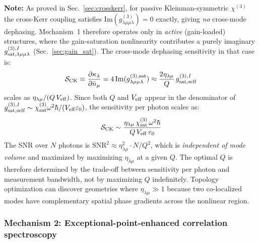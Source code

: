 \documentclass[12pt]{article}
\begin{document}
\textbf{Note:} As proved in Sec.~\ref{sec:crosskerr}, for passive
Kleinman-symmetric $\chi^{(3)}$ the cross-Kerr coupling satisfies
$\mathrm{Im}(g^{(3)}_{\lambda\mu\mu\lambda})=0$ exactly, giving
\emph{no} cross-mode dephasing.  Mechanism~1 therefore operates only in
\emph{active} (gain-loaded) structures, where the gain-saturation
nonlinearity contributes a purely imaginary
$g^{(3),I}_{\rm sat,\lambda\mu\mu\lambda}$
(Sec.~\ref{sec:gain_sat}).  The cross-mode dephasing sensitivity in that case is:
\begin{equation}
  \mathcal{S}_{\rm CK} \equiv
  \frac{\partial\kappa_\lambda}{\partial\bar{n}_\mu} =
  4\,\mathrm{Im}(g^{(3),\rm sat}_{\lambda\mu\mu\lambda})
  \approx \frac{2\eta_{\lambda\mu}}{Q}\,g^{(3),I}_{\rm sat,self}
  \label{eq:CK_sensitivity}
\end{equation}
scales as $\eta_{\lambda\mu}/(Q\,V_{\rm eff})$.  Since both $Q$ and
$V_{\rm eff}$ appear in the denominator of $g^{(3),I}_{\rm sat,self}
\sim\chi^{(3)}_{\rm sat}\omega^2\hbar/(V_{\rm eff}\varepsilon_0)$,
the sensitivity per photon scales as:
\begin{equation}
  \mathcal{S}_{\rm CK} \sim
  \frac{\eta_{\lambda\mu}\,\chi^{(3)}_{\rm sat}\,\omega^2\hbar}
  {Q\,V_{\rm eff}\,\varepsilon_0}
  \label{eq:CK_sens_scaling}
\end{equation}
The SNR over $N$ photons is $\mathrm{SNR}^2\approx\eta_{\lambda\mu}^2\cdot N/Q^2$,
which is \emph{independent of mode volume} and maximized by maximizing
$\eta_{\lambda\mu}$ at a given $Q$.  The optimal $Q$ is therefore
determined by the trade-off between sensitivity per photon and
measurement bandwidth, not by maximizing $Q$ indefinitely.  Topology
optimization can discover geometries where $\eta_{\lambda\mu}\gg 1$
because two co-localized modes have complementary spatial phase gradients
across the nonlinear region.

\subsubsection*{Mechanism 2: Exceptional-point-enhanced correlation spectroscopy}
\end{document}
